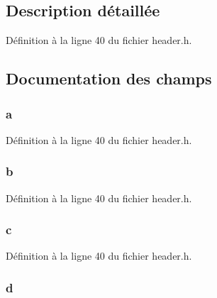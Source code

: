 \subsection{Description détaillée}


Définition à la ligne 40 du fichier header.\-h.



\subsection{Documentation des champs}
\hypertarget{structt__skill__list_a39a494bb9ce01ba13ea4577fe2b1cc79}{
\subsubsection[{a}]{ a}}\label{structt__skill__list_a39a494bb9ce01ba13ea4577fe2b1cc79}


Définition à la ligne 40 du fichier header.\-h.

\hypertarget{structt__skill__list_a85ae40dbaecefd131b936ec65e9f4809}{
\subsubsection[{b}]{ b}}\label{structt__skill__list_a85ae40dbaecefd131b936ec65e9f4809}


Définition à la ligne 40 du fichier header.\-h.

\hypertarget{structt__skill__list_ac9055dd2d5c45c223e3b0e1920c31493}{
\subsubsection[{c}]{ c}}\label{structt__skill__list_ac9055dd2d5c45c223e3b0e1920c31493}


Définition à la ligne 40 du fichier header.\-h.

\hypertarget{structt__skill__list_a0bb2c4a26ff65aecd7a36ad7ee898cd8}{
\subsubsection[{d}]{ d}}\label{structt__skill__list_a0bb2c4a26ff65aecd7a36ad7ee898cd8}


